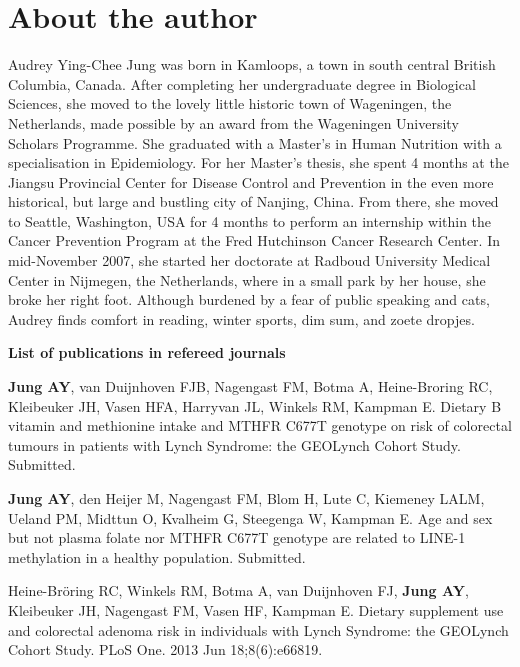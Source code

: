 \chapter*{About the author}
\label{About the author}

\newpage

\noindent Audrey Ying-Chee Jung was born in Kamloops, a town in south central British Columbia, Canada. After completing her undergraduate degree in Biological Sciences, she moved to the lovely little historic town of Wageningen, the Netherlands, made possible by an award from the Wageningen University Scholars Programme. She graduated with a Master's in Human Nutrition with a specialisation in Epidemiology. For her Master's thesis, she spent 4 months at the Jiangsu Provincial Center for Disease Control and Prevention in the even more historical, but large and bustling city of Nanjing, China. From there, she moved to Seattle, Washington, USA for 4 months to perform an internship within the Cancer Prevention Program at the Fred Hutchinson Cancer Research Center. In mid-November 2007, she started her doctorate at Radboud University Medical Center in Nijmegen, the Netherlands, where in a small park by her house, she broke her right foot. Although burdened by a fear of public speaking and cats, Audrey finds comfort in reading, winter sports, dim sum, and zoete dropjes.

\newpage

\noindent \textbf{List of publications in refereed journals}

\noindent \textbf{Jung AY}, van Duijnhoven FJB, Nagengast FM, Botma A, Heine-Broring RC, Kleibeuker JH, Vasen HFA, Harryvan JL, Winkels RM, Kampman E. Dietary B vitamin and methionine intake and MTHFR C677T genotype on risk of colorectal tumours in patients with Lynch Syndrome: the GEOLynch Cohort Study. Submitted.

\noindent \textbf{Jung AY}, den Heijer M, Nagengast FM, Blom H, Lute C, Kiemeney LALM, Ueland PM, Midttun O, Kvalheim G, Steegenga W, Kampman E. Age and sex but not plasma folate nor MTHFR C677T genotype are related to LINE-1 methylation in a healthy population. Submitted.

\noindent Heine-Br\"oring RC, Winkels RM, Botma A, van Duijnhoven FJ, \textbf{Jung AY}, Kleibeuker JH, Nagengast FM, Vasen HF, Kampman E. Dietary supplement use and colorectal adenoma risk in individuals with Lynch Syndrome: the GEOLynch Cohort Study. PLoS One. 2013 Jun 18;8(6):e66819.

